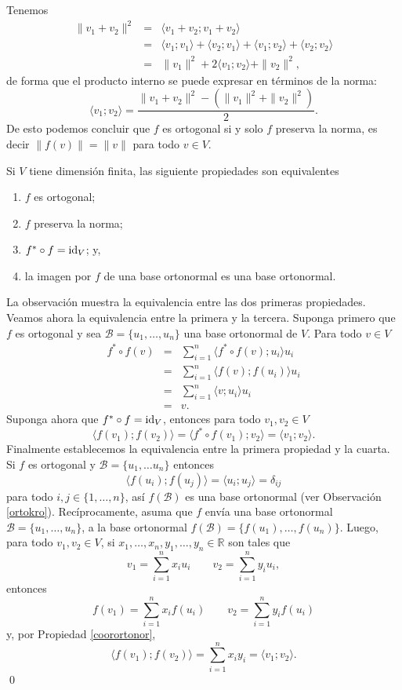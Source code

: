 \begin{obs}
Tenemos
\begin{eqnarray*}
\|v_1+v_2\|^2 & = & \langle v_1+v_2;v_1+v_2 \rangle\\
 & = & \langle v_1;v_1\rangle+\langle v_2;v_1\rangle+\langle v_1;v_2\rangle+\langle v_2;v_2\rangle\\
 & = & \|v_1\|^2+2\langle v_1;v_2\rangle+\|v_2\|^2,
\end{eqnarray*}
de forma que el producto interno se puede expresar en t\'erminos de la norma:
\[
\langle v_1;v_2\rangle=\frac{\|v_1+v_2\|^2-\left(\|v_1\|^2+\|v_2\|^2\right)}{2}.
\]
De esto podemos concluir que $f$ es ortogonal si y solo $f$ preserva la norma, es decir $\|f(v)\|=\|v\|$ para todo $v\in V$.
\end{obs}

\begin{prop}\label{equivorto}
Si $V$ tiene dimensi\'on finita, las siguiente propiedades son equivalentes
\begin{enumerate}
\item $f$ es ortogonal;
\item $f$ preserva la norma;
\item $f^*\circ f=\operatorname{id}_V$; y,
\item la imagen por $f$ de una base ortonormal es una base ortonormal.
\end{enumerate}
\end{prop}

\dem La observaci\'on muestra la equivalencia entre las dos primeras propiedades. Veamos ahora la equivalencia entre la primera y la tercera. Suponga primero que $f$ es ortogonal y sea $\mathcal{B}=\{u_1,\ldots,u_n\}$ una base ortonormal de $V$. Para todo $v\in V$
\begin{eqnarray*}
f^*\circ f(v) & = & \sum_{i=1}^n\langle f^*\circ f(v);u_i\rangle u_i\\
 & = & \sum_{i=1}^n\langle f(v);f(u_i)\rangle u_i\\
 & = & \sum_{i=1}^n\langle v;u_i\rangle u_i\\
 & = & v.
\end{eqnarray*}
Suponga ahora que $f^*\circ f=\operatorname{id}_V$, entonces para todo $v_1,v_2\in V$
\[
\langle f(v_1);f(v_2)\rangle=\langle f^*\circ f(v_1);v_2\rangle=\langle v_1;v_2\rangle.
\]
Finalmente establecemos la equivalencia entre la primera propiedad y la cuarta. Si $f$ es ortogonal y $\mathcal{B}=\{u_1,\ldots u_n\}$ entonces
\[
\langle f(u_i);f(u_j)\rangle=\langle u_i;u_j\rangle=\delta_{ij}
\]
para todo $i,j\in\{1,\ldots,n\}$, as\'i $f(\mathcal{B})$ es una base ortonormal (ver Observaci\'on \ref{ortokro}). Rec\'iprocamente, asuma que $f$ env\'ia una base ortonormal $\mathcal{B}=\{u_1,\ldots,u_n\}$, a la base ortonormal $f(\mathcal{B})=\{f(u_1),\ldots,f(u_n)\}$. Luego, para todo $v_1,v_2\in V$, si $x_1,\ldots,x_n,y_1,\ldots,y_n\in\mathbb{R}$ son tales que
\[
v_1=\sum_{i=1}^nx_iu_i\qquad v_2=\sum_{i=1}^ny_iu_i,
\]
entonces
\[
f(v_1)=\sum_{i=1}^nx_if(u_i)\qquad v_2=\sum_{i=1}^ny_if(u_i)
\]
y, por Propiedad \ref{coorortonor},
\[
\langle f(v_1);f(v_2)\rangle=\sum_{i=1}^nx_iy_i=\langle v_1;v_2\rangle.
\]
\qed

